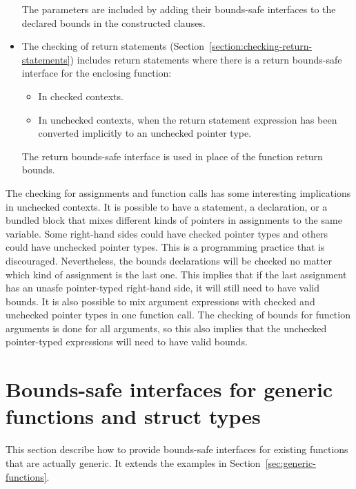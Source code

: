 \begin{itemize}
\begin{itemize}
\end{itemize}
The parameters are included by adding their bounds-safe interfaces to the
declared bounds in the constructed  clauses.
\item The checking of return statements (Section~\ref{section:checking-return-statements})
includes return statements where there is a return bounds-safe interface for the enclosing function:
\begin{itemize}
\item In checked contexts.
\item In unchecked contexts, when the return statement expression has been converted
      implicitly to an unchecked pointer type.
\end{itemize}
The return bounds-safe interface is used in place of the function return bounds.
\end{itemize}

The checking for assignments and function calls has some interesting 
implications in unchecked contexts.  It is possible to have a statement, 
a declaration, or a bundled block that mixes different kinds of pointers
in assignments to the same  variable.  
Some right-hand sides could have checked pointer types and others
could have unchecked pointer types.  This is a programming practice that is discouraged.
Nevertheless, the bounds declarations will be checked no matter which
kind of assignment is the last one.  This implies that if the last 
assignment has an unasfe pointer-typed right-hand side, it will still need
to have valid bounds.   It is also possible to mix argument expressions with 
checked and unchecked  pointer types in one function call.  The checking of bounds
for function arguments is done for all arguments, so this also implies that the unchecked
pointer-typed expressions will need to have valid bounds.

\section{Bounds-safe interfaces for generic functions and struct types}
\label{sec:generic-bounds-safe-interfaces}
This section describe how to provide bounds-safe interfaces for existing functions
that are actually generic. It extends the examples in Section~\ref{sec:generic-functions}.


